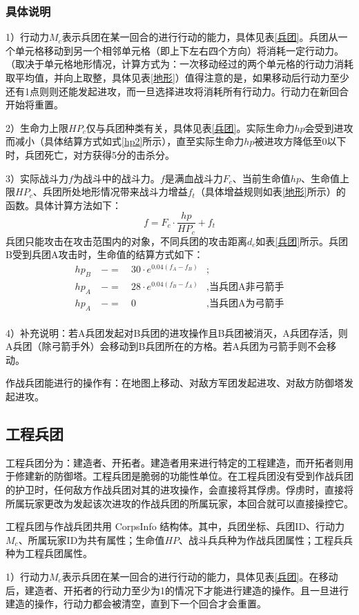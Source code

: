 \documentclass[a4paper,4pt]{article}
\begin{document}
\subsubsection{具体说明}
1）行动力$M_c$表示兵团在某一回合的进行行动的能力，具体见表\ref{兵团}。兵团从一个单元格移动到另一个相邻单元格（即上下左右四个方向）将消耗一定行动力。（取决于单元格地形情况，计算方式为：一次移动经过的两个单元格的行动力消耗取平均值，并向上取整，具体见表\ref{地形}）值得注意的是，如果移动后行动力至少还有1点则则还能发起进攻，而一旦选择进攻将消耗所有行动力。行动力在新回合开始将重置。\par
2）生命力上限$HP_c$仅与兵团种类有关，具体见表\ref{兵团}。实际生命力$hp$会受到进攻而减小（具体结算方式如式\ref{hp2}所示），直至实际生命力$hp$被进攻方降低至0以下时，兵团死亡，对方获得5分的击杀分。\par
3）实际战斗力$f$为战斗中的战斗力。$f$是满血战斗力$F_c$、当前生命值$hp$、生命值上限$HP_c$、兵团所处地形情况带来战斗力增益$f_t$（具体增益规则如表\ref{地形}所示）的函数。具体计算方法如下：
\begin{equation}
  f = F_c \cdot \frac{hp}{HP_c} + f_t\label{f2}
\end{equation}
兵团只能攻击在攻击范围内的对象，不同兵团的攻击距离$d_c$如表\ref{兵团}所示。兵团B受到兵团A攻击时，生命值的结算方式如下：
\begin{equation}
  \begin{aligned}
    hp_{B} & \ -= & \ 30 \cdot e^{0.04(f_{A}-f_{B})} & ;                        \\
    hp_{A} & \ -= & \ 28 \cdot e^{0.04(f_{B}-f_{A})} & , \text{当兵团A非弓箭手} \\
    hp_{A} & \ -= & \ 0                              & , \text{当兵团A为弓箭手} \\
  \end{aligned}
  \label{hp2}
\end{equation}\par
4）补充说明：若A兵团发起对B兵团的进攻操作且B兵团被消灭，A兵团存活，则A兵团（除弓箭手外）会移动到B兵团所在的方格。若A兵团为弓箭手则不会移动。

作战兵团能进行的操作有：在地图上移动、对敌方军团发起进攻、对敌方防御塔发起进攻。


\subsection{工程兵团}
工程兵团分为：建造者、开拓者。建造者用来进行特定的工程建造，而开拓者则用于修建新的防御塔。工程兵团是脆弱的功能性单位。在工程兵团没有受到作战兵团的护卫时，任何敌方作战兵团对其的进攻操作，会直接将其俘虏。俘虏时，直接将所属玩家更改为发起该次进攻的作战兵团的所属玩家，本回合就可以直接操控它。\par
工程兵团与作战兵团共用 CorpsInfo 结构体。其中，兵团坐标、兵团ID、行动力$M_c$、所属玩家ID为共有属性；生命值$HP$、战斗兵兵种为作战兵团属性；工程兵兵种为工程兵团属性。\par
1）行动力$M_c$表示兵团在某一回合的进行行动的能力，具体见表\ref{兵团}。在移动后，建造者、开拓者的行动力至少为1的情况下才能进行建造的操作。且一旦进行建造的操作，行动力都会被清空，直到下一个回合才会重置。\par
\end{document}
